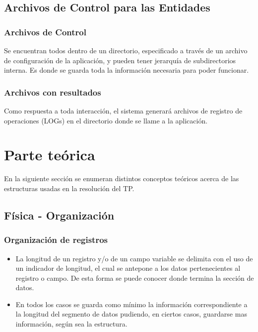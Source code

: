 \documentclass[a4paper,10pt]{article}
\begin{document}
\subsection{Archivos de Control para las Entidades}

\subsubsection{Archivos de Control}

Se encuentran todos dentro de un directorio, especificado a través de un archivo de configuración de la aplicación, y pueden tener jerarquía de subdirectorios interna. Es donde se guarda toda la información necesaria para poder funcionar.

\subsubsection{Archivos con resultados}

Como respuesta a toda interacción, el sistema generará archivos de registro de operaciones (LOGs) en el directorio donde se llame a la aplicación.

\section{Parte teórica}

En la siguiente sección se enumeran distintos conceptos teóricos acerca de las estructuras usadas en la resolución del TP.

\subsection{Física - Organización}

\subsubsection{Organización de registros}
\begin{itemize}
\item La longitud de un registro y/o de un campo variable se delimita con el uso de un indicador de longitud, el cual se antepone a los datos pertenecientes al registro o campo. De esta forma se puede conocer donde termina la sección de datos.
\item En todos los casos se guarda como mínimo la información correspondiente a la longitud del segmento de datos pudiendo, en ciertos casos, guardarse mas información, según sea la estructura.
\end{itemize}
\end{document}
